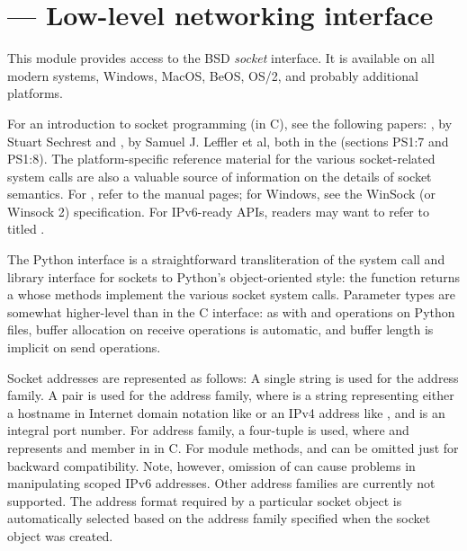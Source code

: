 \section{ ---
         Low-level networking interface}



This module provides access to the BSD \emph{socket} interface.
It is available on all modern \UNIX{} systems, Windows, MacOS, BeOS,
OS/2, and probably additional platforms.

For an introduction to socket programming (in C), see the following
papers: , by Stuart Sechrest and , by Samuel J.  Leffler et al,
both in the 
(sections PS1:7 and PS1:8).  The platform-specific reference material
for the various socket-related system calls are also a valuable source
of information on the details of socket semantics.  For \UNIX, refer
to the manual pages; for Windows, see the WinSock (or Winsock 2)
specification.
For IPv6-ready APIs, readers may want to refer to  titled
.

The Python interface is a straightforward transliteration of the
\UNIX{} system call and library interface for sockets to Python's
object-oriented style: the  function returns a
 whose methods implement the
various socket system calls.  Parameter types are somewhat
higher-level than in the C interface: as with  and
 operations on Python files, buffer allocation on
receive operations is automatic, and buffer length is implicit on send
operations.

Socket addresses are represented as follows:
A single string is used for the  address family.
A pair  is used for the
 address family, where  is a string
representing either a hostname in Internet domain notation like
 or an IPv4 address like ,
and  is an integral port number.
For  address family, a four-tuple
 is
used, where  and  represents
 and  member in
 in C.
For  module methods,  and 
can be omitted just for backward compatibility. Note, however,
omission of  can cause problems in manipulating scoped
IPv6 addresses. Other address families are currently not supported.
The address format required by a particular socket object is
automatically selected based on the address family specified when the
socket object was created.

